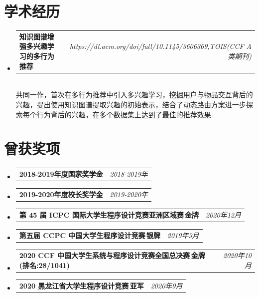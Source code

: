 \documentclass[letterpaper,11pt]{article}
\makeatletter
\newcommand{\resumeItem}[2]{
  \item\small{
    \textbf{#1}{ #2 \vspace{-2pt}}
  }
}
\newcommand{\resumeSubheadingtwo}[2]{
  \vspace{-1pt}\item
    \begin{tabular*}{0.97\textwidth}{l@{\extracolsep{\fill}}r}
      \textbf{#1} & \textit{ #2} \\
    \end{tabular*}\vspace{-5pt}
}
\newcommand{\resumeSubItem}[2]{\resumeItem{#1}{#2}\vspace{-4pt}}
\makeatother
\begin{document}
\section{学术经历}
    \begin{itemize}[leftmargin=*,itemsep=-20pt]
        \resumeSubheadingtwo
            {知识图谱增强多兴趣学习的多行为推荐}{https://dl.acm.org/doi/full/10.1145/3606369,TOIS(CCF A类期刊)}
            \\[5pt]
            共同一作，首次在多行为推荐中引入多兴趣学习，挖掘用户与物品交互背后的兴趣，提出使用知识图谱提取兴趣的初始表示，结合了动态路由方案进一步探索每个行为背后的兴趣，在多个数据集上达到了最佳的推荐效果.
    \end{itemize}

\section{曾获奖项}
    \begin{itemize}[leftmargin=*,itemsep=-20pt]
        \resumeSubheadingtwo
          {2018-2019年度国家奖学金}{2018-2019年}
        \resumeSubheadingtwo
          {2019-2020年度校长奖学金}{2019-2020年}
        \resumeSubheadingtwo
          {第 45 届 ICPC 国际大学生程序设计竞赛亚洲区域赛\,金牌}{2020年12月}
        \resumeSubheadingtwo
          {第五届 CCPC 中国大学生程序设计竞赛\,银牌}{2019年9月}
        \resumeSubheadingtwo
          {2020 CCF 中国大学生系统与程序设计竞赛全国总决赛\,金牌 (排名:28/1041)}{2020年10月}
        \resumeSubheadingtwo
          {2020 黑龙江省大学生程序设计竞赛\,亚军}{2020年9月}
    \end{itemize}
\end{document}
